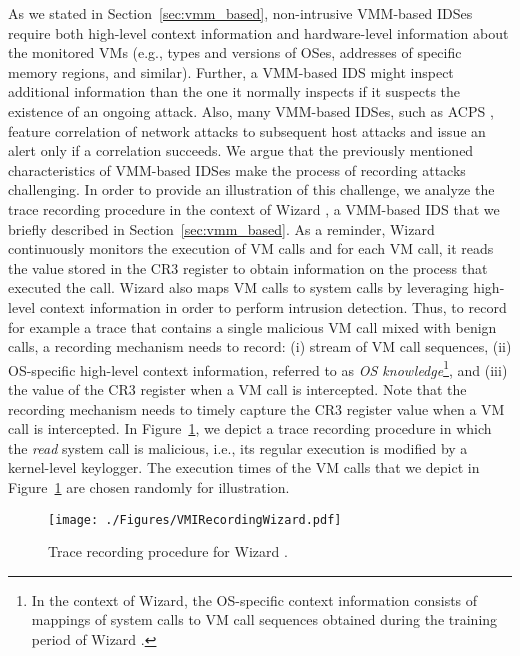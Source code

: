 As we stated in Section~\ref{sec:vmm_based}, non-intrusive VMM-based IDSes require both high-level context information and hardware-level information about the monitored VMs (e.g., types and versions of OSes, addresses of specific memory regions, and similar). Further, a VMM-based IDS might inspect additional information than the one it normally inspects if it suspects the existence of an ongoing attack. Also, many VMM-based IDSes, such as ACPS \cite{lombardi:secure}, feature correlation of network attacks to subsequent host attacks and issue an alert only if a correlation succeeds. We argue that the previously mentioned characteristics of VMM-based IDSes make the process of recording attacks challenging. In order to provide an illustration of this challenge, we analyze the trace recording procedure in the context of Wizard \cite{srivastava:secure}, a VMM-based IDS that we briefly described in Section~\ref{sec:vmm_based}. As a reminder, Wizard continuously monitors the execution of VM calls and for each VM call, it reads the value stored in the CR3 register to obtain information on the process that executed the call. Wizard also maps VM calls to system calls by leveraging high-level context information in order to perform intrusion detection. Thus, to record for example a trace that contains a single malicious VM call mixed with benign calls, a recording mechanism needs to record: (i) stream of VM call sequences, (ii) OS-specific high-level context information, referred to as \emph{OS knowledge}\footnote{In the context of Wizard, the OS-specific context information consists of mappings of system calls to VM call sequences obtained during the training period of Wizard  \cite{srivastava:secure}.}, and (iii) the value of the CR3 register when a VM call is intercepted. Note that the recording mechanism needs to timely capture the CR3 register value when a VM call is intercepted. In Figure~\ref{fig:trace_recording_wizard}, we depict a trace recording procedure in which the \emph{read} system call is malicious, i.e., its regular execution is modified by a kernel-level keylogger. The execution times of the VM calls that we depict in Figure~\ref{fig:trace_recording_wizard} are chosen randomly for illustration.

\begin{figure}[!t]
\centering
\texttt{[image: ./Figures/VMIRecordingWizard.pdf]}
\caption{Trace recording procedure for Wizard \cite{srivastava:secure}.}
\label{fig:trace_recording_wizard}
\end{figure} 

